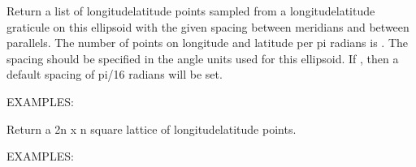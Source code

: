 \documentclass[a4paper,12ptopenany,oneside,english]{sphinxmanual}
\begin{document}
\begin{fulllineitems}
\begin{fulllineitems}
\label{\detokenize{ellipsoids:rhealpixdggs.ellipsoids.Ellipsoid.graticule}}
\pysigstartsignatures
{}
\pysigstopsignatures
\sphinxAtStartPar
Return a list of longitude\sphinxhyphen{}latitude points sampled from a
longitude\sphinxhyphen{}latitude graticule on this ellipsoid with the given
spacing between meridians and between parallels.
The number of points on longitude and latitude per pi radians is .
The spacing should be specified in the angle units used for this
ellipsoid.
If , then a default spacing of pi/16 radians will be set.

\sphinxAtStartPar
EXAMPLES:

\begin{sphinxVerbatim}[commandchars=\\\{\}]
  
\end{sphinxVerbatim}

\end{fulllineitems}


\begin{fulllineitems}
\label{\detokenize{ellipsoids:rhealpixdggs.ellipsoids.Ellipsoid.lattice}}
\pysigstartsignatures
{}
\pysigstopsignatures
\sphinxAtStartPar
Return a 2n x n square lattice of longitude\sphinxhyphen{}latitude points.

\sphinxAtStartPar
EXAMPLES:


\end{fulllineitems}
\end{fulllineitems}
\end{document}
